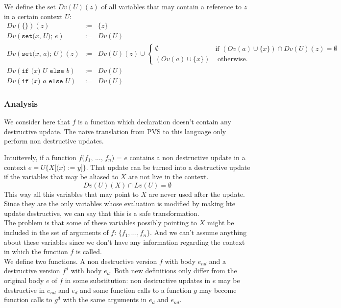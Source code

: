\documentclass[12pt,a4paper]{article}
\newcommand{\cl}[1]{\texttt{#1}}
\newcommand{\ucont}[1]{\{#1\}}
\begin{document}
We define the set $Dv(U)(z)$ of all variables that may contain a reference to $z$ in a certain context $U$:
\begin{eqnarray*}
Dv(\ucont{})(z) &:=& \{ z \} \\
Dv( \cl{set(} x \cl{, } U \cl{); } e ) &:=& Dv(U) \\
Dv( \cl{set(} x \cl{, } a \cl{); } U )(z) &:=& Dv(U)(z) \cup
  \left\lbrace \begin{array}{ll}
  \emptyset & \text{if } (Ov(a) \cup \{ x \}) \cap Dv(U)(z) = \emptyset \\
  (Ov(a) \cup \{ x \}) & \text{ otherwise.}
  \end{array} \right. \\
Dv(\cl{if (} x \cl{) } U \cl{ else } b) &:=& Dv(U) \\
Dv(\cl{if (} x \cl{) } a \cl{ else } U) &:=& Dv(U) 
\end{eqnarray*}

\subsubsection{Analysis}

We consider here that $f$ is a function which declaration doesn't contain any destructive update. The naive translation from PVS to this language only perform non destructive updates.

Intuitevely, if a function $f\cl{(}f_1\cl{, } ... \cl{, } f_n\cl{) = } e$ contains a non destructive update in a context $e = U\ucont{X\cl{[(}x\cl{) := }y\cl{]}}$. That update can be turned into a destructive update if the variables that may be aliased to $X$ are not live in the context.
$$ Dv(U)(X) \cap Lv(U) = \emptyset $$
This way all this variables that may point to $X$ are never used after the update. Since they are the only variables whose evaluation is modified by making hte update destructive, we can say that this is a safe transformation.\\

The problem is that some of these variables possibly pointing to $X$ might be included in the set of arguments of $f$: $\{f_1, ... , f_n\}$. And we can't assume anything about these variables since we don't have any information regarding the context in which the function $f$ is called.\\

We define two functions. A non destructive version $f$ with body $e_{nd}$ and a destructive version $f^d$ with body $e_d$.
Both new definitions only differ from the original body $e$ of $f$ in some substitution: non destructive updates in $e$ may be destructive in $e_{nd}$ and $e_d$ and some function calls to a function $g$ may become function calls to $g^d$ with the same arguments in $e_d$ and $e_{nd}$.\\
\end{document}
